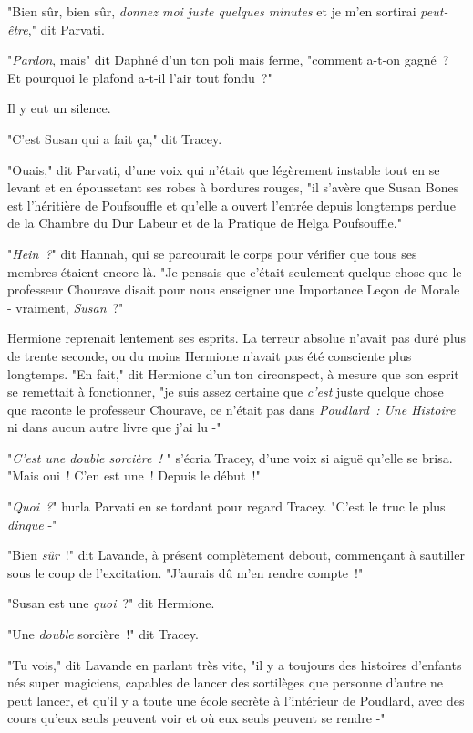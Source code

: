 "Bien sûr, bien sûr, \emph{donnez moi juste quelques minutes} et je m'en sortirai \emph{peut-être}," dit Parvati.

"\emph{Pardon}, mais" dit Daphné d'un ton poli mais ferme, "comment a-t-on gagné~? Et pourquoi le plafond a-t-il l'air tout fondu~?"

Il y eut un silence.

"C'est Susan qui a fait ça," dit Tracey.

"Ouais," dit Parvati, d'une voix qui n'était que légèrement instable tout en se levant et en époussetant ses robes à bordures rouges, "il s'avère que Susan Bones est l'héritière de Poufsouffle et qu'elle a ouvert l'entrée depuis longtemps perdue de la Chambre du Dur Labeur et de la Pratique de Helga Poufsouffle."

"\emph{Hein~?}" dit Hannah, qui se parcourait le corps pour vérifier que tous ses membres étaient encore là. "Je pensais que c'était seulement quelque chose que le professeur Chourave disait pour nous enseigner une Importance Leçon de Morale - vraiment, \emph{Susan}~?"

Hermione reprenait lentement ses esprits. La terreur absolue n'avait pas duré plus de trente seconde, ou du moins Hermione n'avait pas été consciente plus longtemps. "En fait," dit Hermione d'un ton circonspect, à mesure que son esprit se remettait à fonctionner, "je suis assez certaine que \emph{c'est} juste quelque chose que raconte le professeur Chourave, ce n'était pas dans \emph{Poudlard~: Une Histoire} ni dans aucun autre livre que j'ai lu -"

"\emph{C'est une double sorcière~!} " s'écria Tracey, d'une voix si aiguë qu'elle se brisa. "Mais oui~! C'en est une~! Depuis le début~!"

"\emph{Quoi~?}" hurla Parvati en se tordant pour regard Tracey. "C'est le truc le plus \emph{dingue} -"

"Bien \emph{sûr}~!" dit Lavande, à présent complètement debout, commençant à sautiller sous le coup de l'excitation. "J'aurais dû m'en rendre compte~!"

"Susan est une \emph{quoi}~?" dit Hermione.

"Une \emph{double} sorcière~!" dit Tracey.

"Tu vois," dit Lavande en parlant très vite, "il y a toujours des histoires d'enfants nés super magiciens, capables de lancer des sortilèges que personne d'autre ne peut lancer, et qu'il y a toute une école secrète à l'intérieur de Poudlard, avec des cours qu'eux seuls peuvent voir et où eux seuls peuvent se rendre -"

